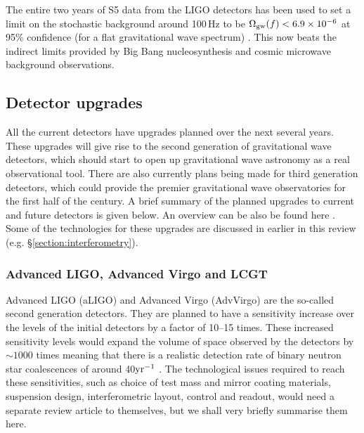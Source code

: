 \documentclass{article}
\begin{document}
The entire two years of S5 data from the LIGO detectors has been used to set a
limit on the stochastic background around 100\,Hz to be $\Omega_{\rm
gw}(f) < 6.9\times10^{-6}$ at 95\% confidence (for a flat gravitational wave
spectrum) \cite{Abbott:2009b}. This now beats the indirect limits provided by
Big Bang nucleosynthesis and cosmic microwave background observations.

\subsection{Detector upgrades}
All the current detectors have upgrades planned over the next several years.
These upgrades will give rise to the second generation of gravitational wave
detectors, which should start to open up gravitational wave astronomy as a
real observational tool. There are also currently plans being made for third
generation detectors, which could provide the premier gravitational wave
observatories for the first half of the century. A brief summary of the planned
upgrades to current and future detectors is given below. An overview can be also
be found here \cite{Whitcomb:2008}. Some of the technologies for these upgrades
are discussed in earlier in this review (e.g. \S\ref{section:interferometry}).

\subsubsection{Advanced LIGO, Advanced Virgo and LCGT}\label{subsection:aligo}
Advanced LIGO (aLIGO) \cite{Harry:2010, AdvLIGO, AdvLIGOweb} and Advanced Virgo (AdvVirgo)
\cite{AdvVirgo, AdvVirgoweb} are the so-called second generation detectors.
They are planned to have a sensitivity increase over the levels of the initial
detectors by a factor of 10--15 times. These increased sensitivity levels would
expand the volume of space observed by the detectors by $\sim1000$ times meaning
that there is a realistic detection rate of binary neutron star coalescences of
around 40${\rm yr}^{-1}$ \cite{Abadie:2010e, Kopparapu:2008}. The technological issues
required to reach these sensitivities, such as choice of test mass and mirror
coating materials, suspension design, interferometric layout, control and
readout, would need a separate review article to themselves, but we shall very
briefly summarise them here.
\end{document}
